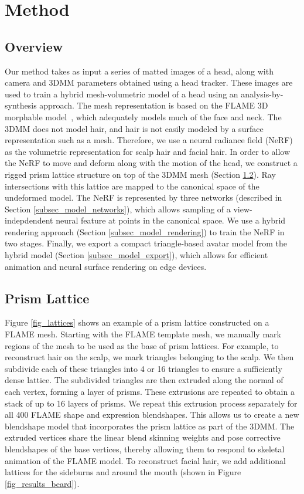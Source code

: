 \section{Method}
\label{sec_method}


\subsection{Overview}
\label{subsec_method_overview}

Our method takes as input a series of matted images of a head, along with camera and 3DMM parameters obtained using a head tracker. These images are used to train a hybrid mesh-volumetric model of a head using an analysis-by-synthesis approach. The mesh representation is based on the FLAME 3D morphable model~\cite{li2017flame}, which adequately models much of the face and neck. The 3DMM does not model hair, and hair is not easily modeled by a surface representation such as a mesh. Therefore, we use a neural radiance field (NeRF)~\cite{mildenhall2021nerf} as the volumetric representation for scalp hair and facial hair. In order to allow the NeRF to move and deform along with the motion of the head, we construct a rigged prism lattice structure on top of the 3DMM mesh (Section \ref{subsec_lattice}). Ray intersections with this lattice are mapped to the canonical space of the undeformed model. The NeRF is represented by three networks (described in Section \ref{subsec_model_networks}), which allows sampling of a view-indepdendent neural feature at points in the canonical space. We use a hybrid rendering approach (Section \ref{subsec_model_rendering}) to train the NeRF in two stages. Finally, we export a compact triangle-based avatar model from the hybrid model (Section \ref{subsec_model_export}), which allows for efficient animation and neural surface rendering on edge devices.

\subsection{Prism Lattice}
\label{subsec_lattice}

Figure \ref{fig_lattices} shows an example of a prism lattice constructed on a FLAME mesh.
Starting with the FLAME template mesh, we manually mark regions of the mesh to be used as the base of prism lattices.  
For example, to reconstruct hair on the scalp, we mark triangles belonging to the scalp. We then subdivide each of these triangles into 4 or 16 triangles to ensure a sufficiently dense lattice. The subdivided triangles are then extruded along the normal of each vertex, forming a layer of prisms. These extrusions are repeated to obtain a stack of up to 16 layers of prisms. We repeat this extrusion process separately for all 400 FLAME shape and expression blendshapes. This allows us to create a new blendshape model that incorporates the prism lattice as part of the 3DMM. The extruded vertices share the linear blend skinning weights and pose corrective blendshapes of the base vertices, thereby allowing them to respond to skeletal animation of the FLAME model. To reconstruct facial hair, we add additional lattices for the sideburns and around the mouth (shown in Figure \ref{fig_results_beard}).

